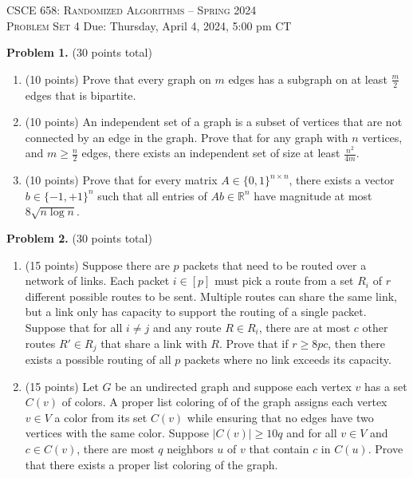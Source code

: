 \documentclass[11pt]{article}
\begin{document}
\begin{center}
{\Large\textsc{CSCE 658: Randomized Algorithms -- Spring 2024 \\ 
Problem Set 4}}
\vskip 0.1in
Due: Thursday, April 4, 2024, 5:00 pm CT
\end{center}

\noindent
\textbf{Problem 1.} (30 points total)
\begin{enumerate}
\item (10 points)
Prove that every graph on $m$ edges has a subgraph on at least $\frac{m}{2}$ edges that is bipartite.
\item (10 points)
An independent set of a graph is a subset of vertices that are not connected by an edge in the graph. 
Prove that for any graph with $n$ vertices, and $m\ge\frac{n}{2}$ edges, there exists an independent set of
size at least $\frac{n^2}{4m}$. 
\item (10 points)
Prove that for every matrix $A\in\{0,1\}^{n\times n}$, there exists a vector $b\in\{-1,+1\}^n$ such that all entries of $Ab\in\mathbb{R}^n$ have magnitude at most $8\sqrt{n\log n}$. 
\end{enumerate}

\vskip 0.2in\noindent
\textbf{Problem 2.} (30 points total)
\begin{enumerate}
\item (15 points)
Suppose there are $p$ packets that need to be routed over a network of links. 
Each packet $i\in[p]$ must pick a route from a set $R_i$ of $r$ different possible routes to be sent. 
Multiple routes can share the same link, but a link only has capacity to support the routing of a single packet. 
Suppose that for all $i\neq j$ and any route $R\in R_i$, there are at most $c$ other routes $R'\in R_j$ that share a link with $R$. 
Prove that if $r\ge 8pc$, then there exists a possible routing of all $p$ packets where no link exceeds its capacity.
\item (15 points)
Let $G$ be an undirected graph and suppose each vertex $v$ has a set $C(v)$ of colors. 
A proper list coloring of of the graph assigns each vertex $v\in V$ a color from its set $C(v)$ while ensuring that no edges have two vertices with the same color. 
Suppose $|C(v)|\ge 10q$ and for all $v\in V$ and $c\in C(v)$, there are most $q$ neighbors $u$ of $v$ that contain $c$ in $C(u)$. 
Prove that there exists a proper list coloring of the graph. 
\end{enumerate}
\end{document}
